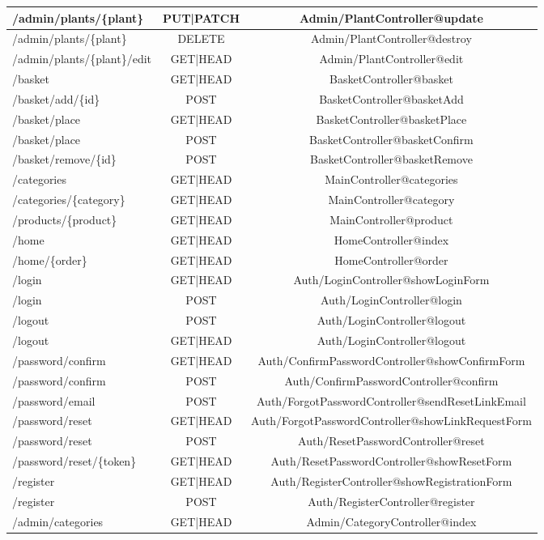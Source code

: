 \begin{small}
\begin{xltabular}{\textwidth}{|X|c|c|}
	/admin/plants/\{plant\}  & PUT|PATCH & Admin/PlantController@update \\ \hline
	/admin/plants/\{plant\} & DELETE & Admin/PlantController@destroy \\ \hline
	/admin/plants/\{plant\}/edit & GET|HEAD & Admin/PlantController@edit   \\ \hline
	/basket & GET|HEAD & BasketController@basket \\ \hline
	/basket/add/\{id\}& POST & BasketController@basketAdd \\ \hline
	/basket/place & GET|HEAD & BasketController@basketPlace \\ \hline
	/basket/place & POST & BasketController@basketConfirm  \\ \hline
	/basket/remove/\{id\}& POST & BasketController@basketRemove \\ \hline
	/categories & GET|HEAD & MainController@categories  \\ \hline
	/categories/\{category\}& GET|HEAD & MainController@category \\ \hline
	/products/\{product\}& GET|HEAD & MainController@product \\ \hline
	/home & GET|HEAD & HomeController@index \\ \hline
	/home/\{order\} & GET|HEAD & HomeController@order \\ \hline
	/login & GET|HEAD & Auth/LoginController@showLoginForm  \\ \hline
	/login & POST & Auth/LoginController@login  \\ \hline
	/logout & POST & Auth/LoginController@logout  \\ \hline
	/logout & GET|HEAD & Auth/LoginController@logout  \\ \hline
	/password/confirm & GET|HEAD & Auth/ConfirmPasswordController@showConfirmForm  \\ \hline
	/password/confirm & POST & Auth/ConfirmPasswordController@confirm  \\ \hline
	/password/email & POST & Auth/ForgotPasswordController@sendResetLinkEmail \\ \hline
	/password/reset & GET|HEAD & Auth/ForgotPasswordController@showLinkRequestForm  \\ \hline
	/password/reset & POST & Auth/ResetPasswordController@reset  \\ \hline
	/password/reset/\{token\} & GET|HEAD & Auth/ResetPasswordController@showResetForm  \\ \hline
	/register & GET|HEAD & Auth/RegisterController@showRegistrationForm  \\ \hline
	/register & POST & Auth/RegisterController@register  \\ \hline
	/admin/categories & GET|HEAD & Admin/CategoryController@index 
\end{xltabular}
\end{small}


